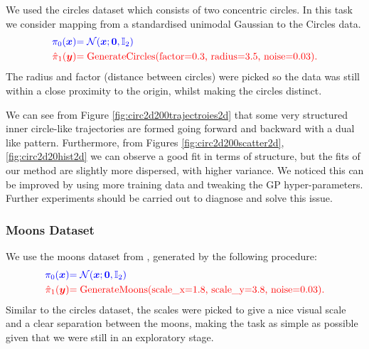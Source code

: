 \documentclass[a4paper,12pt,twoside,openright]{report}
\theoremstyle{definition}
\begin{document}
We  used the circles dataset \citep{pedregosa2011scikit} which consists of two concentric circles. In this task we consider mapping from a standardised unimodal Gaussian to the Circles data.
\begin{align*}
     \color{blue}{\pi_0({\bm{x}})} &\color{blue}{= {\mathcal{N}}({\bm{x}}; {\bm{0}},  \mathbb{I}_2)} \\
    \color{red}{\hat{\pi}_1({\bm{y}})} &\color{red}{= \text{GenerateCircles(factor=0.3, radius=3.5, noise=0.03)}}.
\end{align*}
The radius and factor (distance between circles) were picked so the data was still within a close proximity to the origin, whilst making the circles distinct.

We can see from Figure \ref{fig:circ2d200trajectroies2d} that some very structured inner circle-like trajectories are formed going forward and backward with a dual like pattern. Furthermore, from Figures \ref{fig:circ2d200scatter2d}, \ref{fig:circ2d20hist2d} we can observe a good fit in terms of structure, but the fits of our method are slightly more dispersed, with higher variance. We noticed this can be improved by using more training data and tweaking the GP hyper-parameters. Further experiments should be carried out to diagnose and solve this issue. 


\subsubsection{Moons Dataset}
We use the moons dataset from \cite{pedregosa2011scikit}, generated by the following procedure:
\begin{align*}
     \color{blue}{\pi_0({\bm{x}})} &\color{blue}{= {\mathcal{N}}({\bm{x}}; {\bm{0}},  \mathbb{I}_2)} \\
    \color{red}{\hat{\pi}_1({\bm{y}})} &\color{red}{= \text{GenerateMoons(scale\_x=1.8, scale\_y=3.8, noise=0.03)}}.
\end{align*}
Similar to the circles dataset, the scales were picked to give a nice visual scale and a clear separation between the moons, making the task as simple as possible given that we were still in an exploratory stage.
\end{document}
